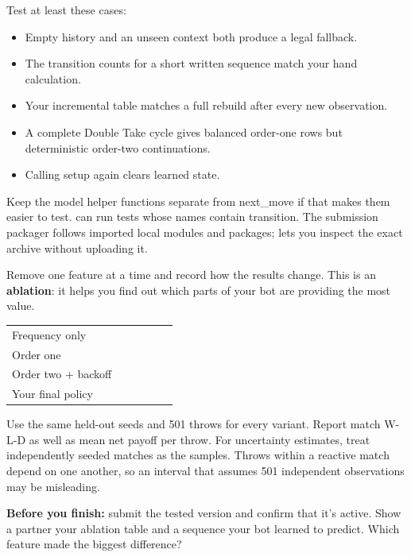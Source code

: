 \documentclass[11pt]{article}
\begin{document}

Test at least these cases:


\begin{itemize}
\item Empty history and an unseen context both produce a legal fallback.
\item The transition counts for a short written sequence match your hand calculation.
\item Your incremental table matches a full rebuild after every new observation.
\item A complete Double Take cycle gives balanced order-one rows but deterministic order-two continuations.
\item Calling setup again clears learned state.
\end{itemize}

Keep the model helper functions separate from next\_move if that makes them easier to test.  can run tests whose names contain transition. The submission packager follows imported local modules and packages;  lets you inspect the exact archive without uploading it.



Remove one feature at a time and record how the results change. This is an \textbf{ablation}: it helps you find out which parts of your bot are providing the most value.


\smallskip\begingroup\small
\setlength{\tabcolsep}{5pt}
\renewcommand{\arraystretch}{1.17}
\begin{tabularx}{\linewidth}{@{}L{.25\linewidth}YYYYY@{}}
\toprule
{} &  &  &  &  &  \\
\midrule
\rule{0pt}{22pt}Frequency only &  &  &  &  &  \\
\rule{0pt}{22pt}Order one &  &  &  &  &  \\
\rule{0pt}{22pt}Order two + backoff &  &  &  &  &  \\
\rule{0pt}{22pt}Your final policy &  &  &  &  &  \\
\bottomrule
\end{tabularx}\endgroup\par\smallskip

Use the same held-out seeds and 501 throws for every variant. Report match W-L-D as well as mean net payoff per throw. For uncertainty estimates, treat independently seeded matches as the samples. Throws within a reactive match depend on one another, so an interval that assumes 501 independent observations may be misleading.


\begin{checkpoint}
\textbf{Before you finish:} submit the tested version and confirm that it's active. Show a partner your ablation table and a sequence your bot learned to predict. Which feature made the biggest difference?
\end{checkpoint}
\end{document}
